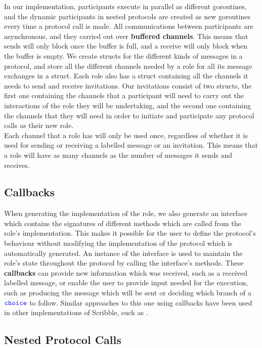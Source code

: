 \documentclass[12pt,twoside]{report}
\begin{document}
In our implementation, participants execute in parallel as different goroutines, and the dynamic participants in nested protocols are created as new goroutines every time a protocol call is made. All communications between participants are asynchronous, and they carried out over \textbf{buffered channels}. This means that sends will only block once the buffer is full, and a receive will only block when the buffer is empty. We create structs for the different kinds of messages in a protocol, and store all the different channels needed by a role for all its message exchanges in a struct. Each role also has a struct containing all the channels it needs to send and receive invitations. Our invitations consist of two structs, the first one containing the channels that a participant will need to carry out the interactions of the role they will be undertaking, and the second one containing the channels that they will need in order to initiate and participate any protocol calls as their new role. \\

Each channel that a role has will only be used once, regardless of whether it is used for sending or receiving a labelled message or an invitation. This means that a role will have as many channels as the number of messages it sends and receives.

\subsection{Callbacks}
When generating the implementation of the role, we also generate an interface which contains the signatures of different methods which are called from the role's implementation. This makes it possible for the user to define the protocol's behaviour without modifying the implementation of the protocol which is automatically generated. An instance of the interface is used to maintain the role's state throughout the protocol by calling the interface's methods. These \textbf{callbacks} can provide new information which was received, such as a received labelled message, or enable the user to provide input needed for the execution, such as producing the message which will be sent or deciding which branch of a ${\color{blue}\mathtt{choice}}$ to follow. Similar approaches to this one using callbacks have been used in other implementations of Scribble, such as \cite{scribble-callbacks}.

\subsection{Nested Protocol Calls}
\end{document}
